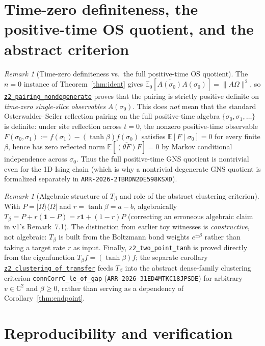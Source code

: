 \documentclass[11pt]{article}
\theoremstyle{remark}
\newtheorem{remark}[theorem]{Remark}
\theoremstyle{definition}
\newcommand{\lean}[1]{\texttt{#1}}
\newcommand{\anchor}{bd2c18394ce8a55ec73413c11a9f311bbf002248}
\newcommand{\osline}[3]{%
  \href{https://github.com/lluiseriksson/THE-ERIKSSON-PROGRAMME/blob/\anchor/YangMills/OS/#1.lean\#L#2}{\nolinkurl{#3}}}
\newcommand{\C}{\mathbb{C}}
\newcommand{\Om}{\Omega}
\newcommand{\Ex}{\mathbb{E}}
\newcommand{\ket}[1]{|#1\rangle}
\newcommand{\bra}[1]{\langle #1|}
\begin{document}
\section{Time-zero definiteness, the positive-time OS quotient, and the abstract criterion}

\begin{remark}[Time-zero definiteness vs.\ the full positive-time OS quotient]\label{rem:quotient}
The $n=0$ instance of Theorem~\ref{thm:ident} gives
$\Ex_0[\overline{A(\sigma_0)}A(\sigma_0)] = \|A\Om\|^2$, so
\osline{Z2Identification}{417}{z2\_pairing\_nondegenerate} proves that the pairing is
strictly positive definite on \emph{time-zero single-slice observables} $A(\sigma_0)$.
This does \emph{not} mean that the standard Osterwalder--Seiler reflection pairing on the
full positive-time algebra $\{\sigma_0, \sigma_1, \dots\}$ is definite: under site
reflection across $t=0$, the nonzero positive-time observable
$F(\sigma_0,\sigma_1) := f(\sigma_1) - (\tanh\beta)f(\sigma_0)$ satisfies
$\Ex[F \mid \sigma_0] = 0$ for every finite $\beta$, hence has zero reflected norm
$\Ex[\overline{(\theta F)} F] = 0$ by Markov conditional independence across $\sigma_0$.
Thus the full positive-time GNS quotient is nontrivial even for the 1D Ising chain (which
is why a nontrivial degenerate GNS quotient is formalized separately in
\texttt{ARR-2026-2TBRDN2DE598KSXD}).
\end{remark}

\begin{remark}[Algebraic structure of $T_\beta$ and role of the abstract clustering criterion]
With $P = \ket{\Om}\bra{\Om}$ and $r = \tanh\beta = a-b$, algebraically
$T_\beta = P + r(\mathbf{1}-P) = r\mathbf{1} + (1-r)P$ (correcting an erroneous algebraic
claim in v1's Remark~7.1). The distinction from earlier toy witnesses is \emph{constructive},
not algebraic: $T_\beta$ is built from the Boltzmann bond weights $e^{\pm\beta}$ rather
than taking a target rate $r$ as input. Finally, \lean{z2\_two\_point\_tanh} is proved
directly from the eigenfunction $T_\beta f = (\tanh\beta)f$; the separate corollary
\osline{Z2Transfer}{301}{z2\_clustering\_of\_transfer} feeds $T_\beta$ into the abstract
dense-family clustering criterion \lean{connCorrC\_le\_of\_gap} (\texttt{ARR-2026-31ED4MTKC18JPSDE})
for arbitrary $v \in \C^2$ and $\beta \ge 0$, rather than serving as a dependency of
Corollary~\ref{thm:endpoint}.
\end{remark}

\section{Reproducibility and verification}
\end{document}
